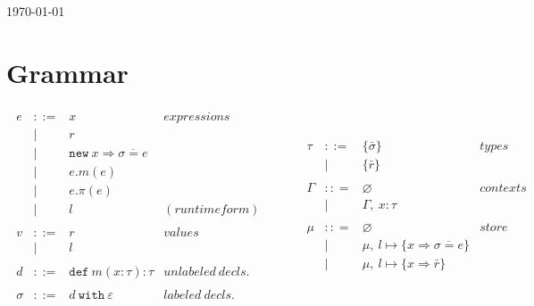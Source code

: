 \documentclass{llncs}
\newcommand{\keywadj}[1]{\mathtt{#1}}
\newcommand{\keyw}[1]{\keywadj{#1}~}
\begin{document}
\today

\section{Grammar}

\[
\begin{array}{lll}
\begin{array}{lllr}
	e & ::= & x & expressions \\
  		& | & r \\
  		& | & \keywadj{new}~x \Rightarrow \overline{\sigma = e} \\
  		& | & e.m(e)\\
  		& | & e.\pi(e)\\
		& | & l & (runtime form) \\
		&&\\
		
	v & ::= & r & values \\
		& | & l \\
		&&\\

	d & ::= & \keyw{def} m(x:\tau):\tau & unlabeled~decls.\\		&&\\
		
	\sigma & ::= & d~\keyw{with}\varepsilon  & labeled~ decls.\\
		&&\\
\end{array}
& ~~~~~~
&

\begin{array}{lllr}

	\tau & ::= & \{ \bar \sigma \}  & types \\
		& | & \{ \bar r \} \\
		&&\\

	\Gamma & :: = & \varnothing & contexts\\
		& | & \Gamma,~x : \tau\\
		&&\\

	\mu & :: = & \varnothing & store\\
		& | & \mu,~l \mapsto \{ x \Rightarrow \overline{\sigma = e}\} \\
		& | & \mu,~l \mapsto \{ x \Rightarrow \bar r \} \\
&&\\

\end{array}
\end{array}
\]
\end{document}
